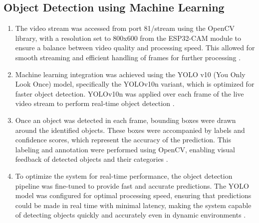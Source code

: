 \documentclass[12pt,a4paper]{report}
\begin{document}
\subsection{Object Detection using Machine Learning}
\begin{enumerate}
\item The video stream was accessed from port 81/stream using the OpenCV library, with a resolution set to 800x600 from the ESP32-CAM module to ensure a balance between video quality and processing speed. This allowed for smooth streaming and efficient handling of frames for further processing \cite{esp32cam}.
\item Machine learning integration was achieved using the YOLO v10 (You Only Look Once) model, specifically the YOLOv10n variant, which is optimized for faster object detection. YOLOv10n was applied over each frame of the live video stream to perform real-time object detection \cite{yolov10}.
\item Once an object was detected in each frame, bounding boxes were drawn around the identified objects. These boxes were accompanied by labels and confidence scores, which represent the accuracy of the prediction. This labeling and annotation were performed using OpenCV, enabling visual feedback of detected objects and their categories \cite{homl}.
\item To optimize the system for real-time performance, the object detection pipeline was fine-tuned to provide fast and accurate predictions. The YOLO model was configured for optimal processing speed, ensuring that predictions could be made in real time with minimal latency, making the system capable of detecting objects quickly and accurately even in dynamic environments \cite{robotsearch}.


\end{enumerate}
\end{document}
